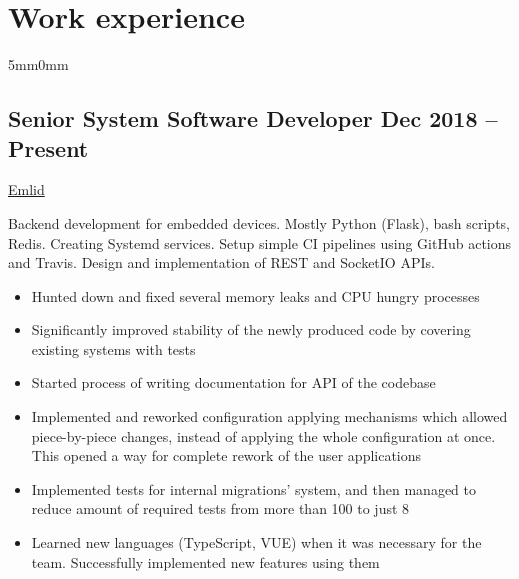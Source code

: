 \documentclass[10pt]{article}
\newcommand{\lmvalue}{5mm}
\newcommand{\rmvalue}{0mm}
\begin{document}
    \section*{Work experience}
    \begin{changemargin}{\lmvalue}{\rmvalue}
        \subsection*{Senior System Software Developer \hfill {\color{gray}Dec 2018 –
        Present}}
        \href{https://emlid.com}{Emlid}

        Backend development for embedded devices.
        Mostly Python (Flask), bash scripts, Redis.
        Creating Systemd services.
        Setup simple CI pipelines using GitHub actions and Travis.
        Design and implementation of REST and SocketIO APIs.
        \begin{itemize}
            \item Hunted down and fixed several memory leaks and CPU hungry
            processes
            \item Significantly improved stability of the newly produced
            code by covering existing systems with tests
            \item Started process of writing documentation for API of the
            codebase
            \item Implemented and reworked configuration applying
            mechanisms which allowed piece-by-piece changes, instead of applying the whole
            configuration at once.
            This opened a way for complete rework of the user applications
            \item Implemented tests for internal migrations' system, and
            then managed to reduce amount of required tests from more than 100 to just 8
            \item Learned new languages (TypeScript, VUE) when it was necessary for the team.
            Successfully implemented new features using them
        \end{itemize}


\end{changemargin}
\end{document}
